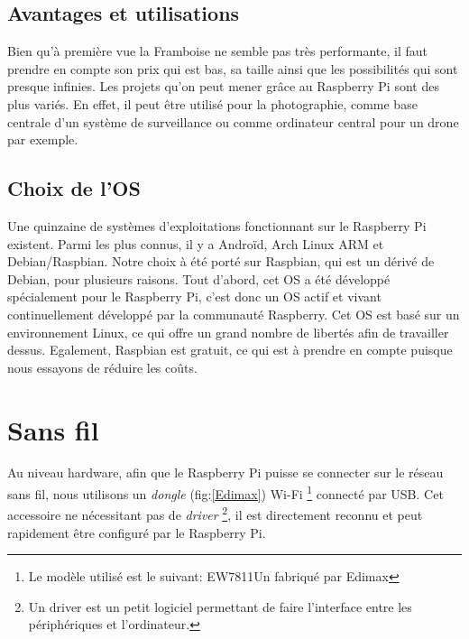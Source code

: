\documentclass[a4paper,11pt]{report}
\begin{document}
{\subsection{Avantages et utilisations}
Bien qu'à première vue la Framboise ne semble pas très performante, il faut prendre en compte son prix qui est bas, sa taille ainsi que les possibilités qui sont presque infinies. Les projets qu'on peut mener grâce au Raspberry Pi sont des plus variés. En effet, il peut être utilisé pour la photographie, comme base centrale d'un système de surveillance ou comme ordinateur central pour un drone par exemple.

\subsection{Choix de l'OS}
Une quinzaine de systèmes d'exploitations fonctionnant sur le Raspberry Pi existent. Parmi les plus connus, il y a Androïd, Arch Linux ARM et Debian/Raspbian. 
Notre choix à été porté sur Raspbian, qui est un dérivé de Debian, pour plusieurs raisons. Tout d'abord, cet OS a été développé spécialement pour le Raspberry Pi, c'est donc un OS actif et vivant continuellement développé par la communauté Raspberry. Cet OS est basé sur un environnement Linux, ce qui offre un grand nombre de libertés afin de travailler dessus. Egalement, Raspbian est gratuit, ce qui est à prendre en compte puisque nous essayons de réduire les coûts.  

\section{Sans fil}

Au niveau hardware, afin que le Raspberry Pi puisse se connecter sur le réseau
sans fil, nous utilisons un \textit{dongle} (fig:\ref{Edimax})
Wi-Fi \footnote{Le modèle utilisé est le suivant: EW7811Un fabriqué par
  Edimax} connecté par USB. Cet accessoire ne nécessitant pas de \textit{driver} \footnote{Un
  driver est un petit logiciel permettant de faire l'interface entre les
  périphériques et l'ordinateur.}, il est directement reconnu et peut rapidement être configuré par le Raspberry Pi. 

}
\end{document}
